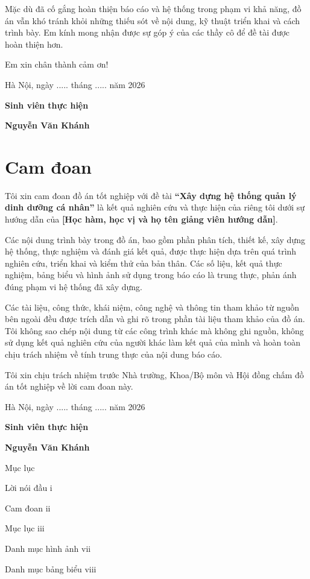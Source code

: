 Mặc dù đã cố gắng hoàn thiện báo cáo và hệ thống trong phạm vi khả năng, đồ án vẫn khó tránh khỏi những thiếu sót về nội dung, kỹ thuật triển khai và cách trình bày. Em kính mong nhận được sự góp ý của các thầy cô để đề tài được hoàn thiện hơn.

Em xin chân thành cảm ơn!

Hà Nội, ngày ..... tháng ..... năm 2026

\textbf{Sinh viên thực hiện}

\textbf{Nguyễn Văn Khánh}


\chapter*{Cam đoan}
Tôi xin cam đoan đồ án tốt nghiệp với đề tài \textbf{“Xây dựng hệ thống quản lý dinh dưỡng cá nhân”} là kết quả nghiên cứu và thực hiện của riêng tôi dưới sự hướng dẫn của \textbf{[Học hàm, học vị và họ tên giảng viên hướng dẫn]}.

Các nội dung trình bày trong đồ án, bao gồm phần phân tích, thiết kế, xây dựng hệ thống, thực nghiệm và đánh giá kết quả, được thực hiện dựa trên quá trình nghiên cứu, triển khai và kiểm thử của bản thân. Các số liệu, kết quả thực nghiệm, bảng biểu và hình ảnh sử dụng trong báo cáo là trung thực, phản ánh đúng phạm vi hệ thống đã xây dựng.

Các tài liệu, công thức, khái niệm, công nghệ và thông tin tham khảo từ nguồn bên ngoài đều được trích dẫn và ghi rõ trong phần tài liệu tham khảo của đồ án. Tôi không sao chép nội dung từ các công trình khác mà không ghi nguồn, không sử dụng kết quả nghiên cứu của người khác làm kết quả của mình và hoàn toàn chịu trách nhiệm về tính trung thực của nội dung báo cáo.

Tôi xin chịu trách nhiệm trước Nhà trường, Khoa/Bộ môn và Hội đồng chấm đồ án tốt nghiệp về lời cam đoan này.

Hà Nội, ngày ..... tháng ..... năm 2026

\textbf{Sinh viên thực hiện}

\textbf{Nguyễn Văn Khánh}

		Mục lục

	

Lời nói đầu	i

Cam đoan	ii

Mục lục	iii

Danh mục hình ảnh	vii

Danh mục bảng biểu	viii

